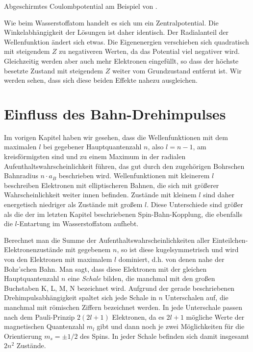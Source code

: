 \begin{marginfigure}
    \caption{Abgeschirmtes Coulombpotential am Beispiel von . }
    \label{fig:6_coulomb_schirm}
\end{marginfigure}

Wie beim Wasserstoffatom handelt es sich um ein Zentralpotential. Die Winkelabhängigkeit der Lösungen ist daher identisch. Der Radialanteil der Wellenfunktion ändert sich etwas. Die Eigenenergien verschieben sich quadratisch mit steigendem $Z$ zu negativeren Werten, da das Potential viel negativer wird. Gleichzeitig werden aber auch mehr Elektronen eingefüllt, so dass der höchste besetzte Zustand mit steigendem $Z$ weiter vom Grundzustand entfernt ist. Wir werden sehen, dass sich diese beiden Effekte nahezu ausgleichen.


\section{Einfluss des Bahn-Drehimpulses}

Im vorigen Kapitel haben wir gesehen, dass die Wellenfunktionen mit dem maximalen $l$ bei gegebener Hauptquantenzahl $n$, also $l=n-1$, am kreisförmigsten sind und zu einem Maximum in der radialen Aufenthaltswahrscheinlichkeit führen, das gut durch den zugehörigen Bohrschen Bahnradius $n \cdot a_B$ beschrieben wird. Wellenfunktionen mit kleinerem $l$ beschreiben Elektronen mit elliptischeren Bahnen, die sich mit größerer Wahrscheinlichkeit weiter innen befinden. Zustände mit kleinem $l$ sind daher energetisch niedriger als Zustände mit großem $l$. Diese Unterschiede sind größer als die der im letzten Kapitel beschriebenen Spin-Bahn-Kopplung, die ebenfalls die $l$-Entartung im Wasserstoffatom aufhebt.

Berechnet man die Summe der Aufenthaltswahrscheinlichkeiten aller Einteilchen-Elektronenzustände mit gegebenem $n$, so ist diese kugelsymmetrisch und wird von den Elektronen mit maximalem $l$ dominiert, d.h. von denen nahe  der Bohr'schen Bahn. 
Man sagt, dass diese Elektronen mit der gleichen Hauptquantenzahl $n$ eine \emph{Schale} bilden, die manchmal mit den großen Buchstaben K, L, M, N bezeichnet wird.  Aufgrund der gerade beschriebenen Drehimpulsabhängigkeit spaltet sich jede Schale in $n$ Unterschalen auf, die manchmal mit römischen Ziffern bezeichnet werden. In jede Unterschale passen nach dem Pauli-Prinzip $2 (2l +1)$ Elektronen, da es $2l +1$ mögliche Werte der magnetischen Quantenzahl $m_l$ gibt und dann noch je zwei Möglichkeiten für die Orientierung $m_s = \pm 1/2$ des Spins. In jeder Schale befinden sich damit insgesamt $2n^2$ Zustände.

